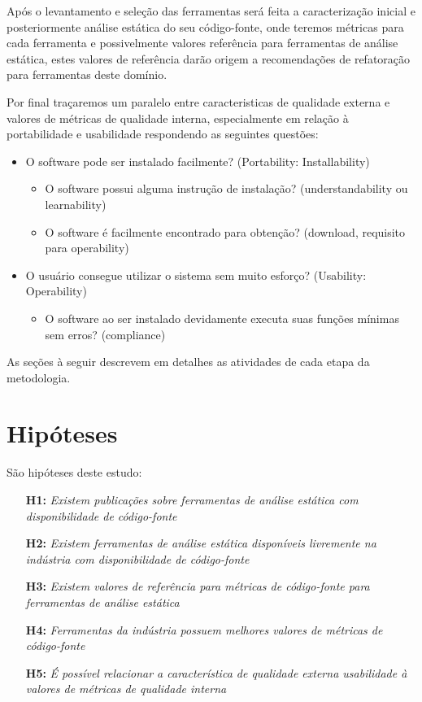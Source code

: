 \documentclass[qual, classic, a4paper]{ufbathesis}
\begin{document}
Após o levantamento e seleção das ferramentas será feita a caracterização
inicial e posteriormente análise estática do seu código-fonte, onde teremos
métricas para cada ferramenta e possivelmente valores referência para
ferramentas de análise estática, estes
valores de referência darão origem a recomendações de refatoração para
ferramentas deste domínio.

Por final traçaremos um paralelo entre caracteristicas de qualidade externa
e valores de métricas de qualidade interna, especialmente em
relação à portabilidade e usabilidade respondendo as seguintes questões:

\begin{itemize}
  \item O software pode ser instalado facilmente? (Portability: Installability)
    \begin{itemize}
      \item O software possui alguma instrução de instalação? (understandability ou learnability)
      \item O software é facilmente encontrado para obtenção? (download, requisito para operability)
    \end{itemize}
  \item O usuário consegue utilizar o sistema sem muito esforço? (Usability: Operability)
    \begin{itemize}
      \item O software ao ser instalado devidamente executa suas funções mínimas sem erros? (compliance)
    \end{itemize}
\end{itemize}

As seções à seguir descrevem em detalhes as atividades de cada etapa da metodologia.

\section{Hipóteses}

São hipóteses deste estudo:

\begin{enumerate}
  \item[{\bf H1:}] {\em Existem publicações sobre ferramentas de análise
    estática com disponibilidade de código-fonte}
  \item[{\bf H2:}] {\em Existem ferramentas de análise estática disponíveis
    livremente na indústria com disponibilidade de código-fonte}
  \item[{\bf H3:}] {\em Existem valores de referência para métricas de
    código-fonte para ferramentas de análise estática}
  \item[{\bf H4:}] {\em Ferramentas da indústria possuem melhores valores de
    métricas de código-fonte}
  \item[{\bf H5:}] {\em É possível relacionar a característica de qualidade
    externa usabilidade à valores de métricas de qualidade interna}
\end{enumerate}
\end{document}
